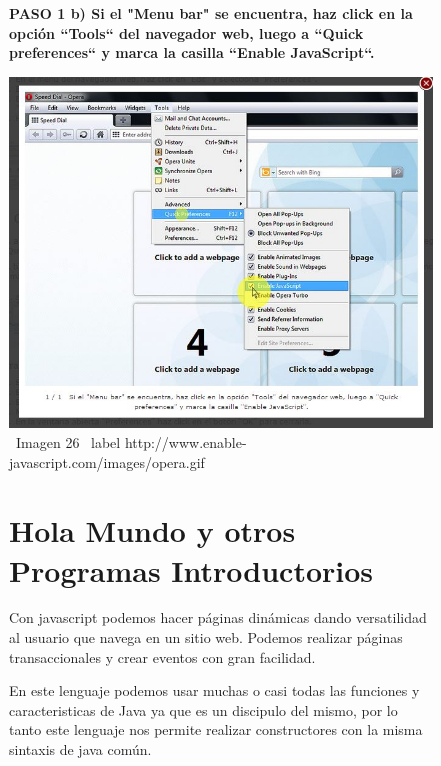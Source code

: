 \documentclass[11pt]{article} %
\begin{document}
\begin{figure}
\begin{center}

\begin{center}
\bf PASO 1
 b) Si el "Menu bar" se encuentra, haz click en la opción ``Tools`` del navegador web, luego a ``Quick preferences`` y marca la casilla ``Enable JavaScript``.
\end{center}

\includegraphics[height=8 cm, width=8 cm] {imagenes/opera 02.JPG}
\newline
\newline
\ Imagen 26
\ label {http://www.enable-javascript.com/images/opera.gif}



\section{Hola Mundo y otros Programas Introductorios} 

Con javascript podemos hacer páginas dinámicas dando versatilidad al usuario que navega en un sitio web. Podemos realizar páginas transaccionales y crear eventos con gran facilidad.



En este lenguaje podemos usar muchas o casi todas las funciones y caracteristicas de Java ya que es un discipulo del mismo, por lo tanto este lenguaje nos permite realizar constructores con la misma sintaxis de java común.



\end{center}
\end{figure}
\end{document}
